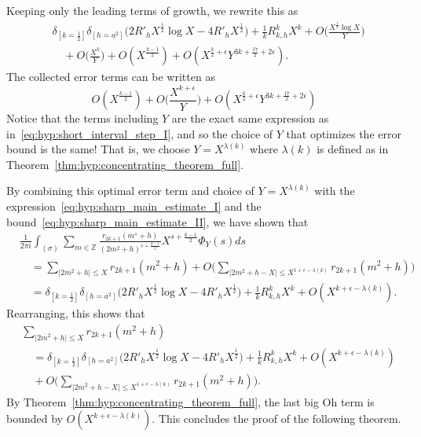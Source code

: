 Keeping only the leading terms of growth, we rewrite this as
\begin{align}
  &\delta_{[k = \frac{1}{2}]} \delta_{[h = a^2]} \bigg( 2 R'_h X^{\frac{1}{2}} \log X -4
R'_h X^{\frac{1}{2}} \bigg) + \tfrac{1}{k} R_{k, h}^k X^{k} +  O\big(\frac{X^{\frac{1}{2}}
\log X}{Y}\big) \\
  &\quad + O\big(\frac{X^{k}}{Y}\big)
  + O(X^{\frac{k-1}{2}})
  + O(X^{\frac{k}{2} + \epsilon} Y^{3k + \frac{17}{2} + 2\epsilon}).
\end{align}
The collected error terms can be written as
\begin{equation}
  O(X^{\frac{k-1}{2}})
  + O\big(\frac{X^{k+\epsilon}}{Y}\big)
  + O(X^{\frac{k}{2} + \epsilon} Y^{3k + \frac{17}{2} + 2\epsilon})
\end{equation}
Notice that the terms including $Y$ are the exact same expression as
in~\eqref{eq:hyp:short_interval_step_I}, and so the choice of $Y$ that optimizes the error
bound is the same!
That is, we choose $Y = X^{\lambda(k)}$ where $\lambda(k)$ is defined as in
Theorem~\ref{thm:hyp:concentrating_theorem_full}.


By combining this optimal error term and choice of $Y = X^{\lambda(k)}$ with the
expression~\eqref{eq:hyp:sharp_main_estimate_I} and the
bound~\eqref{eq:hyp:sharp_main_estimate_II}, we have shown that
\begin{align}
  &\frac{1}{2\pi i} \int_{(\sigma)} \sum_{m \in \mathbb{Z}} \frac{r_{2k+1}{(m^s +
h)}}{(2m^2 + h)^{s + \frac{k-1}{2}}} X^{s + \frac{k-1}{2}} \Phi_Y(s) ds \\
  &\quad =\sum_{\lvert 2m^2 + h \rvert \leq X} r_{2k+1}(m^2 + h) +O \bigg( \sum_{\lvert
  2m^2+h - X \rvert \leq X^{1 + \epsilon - \lambda(k)}} r_{2k+1}(m^2+h)\bigg)  \\
  &\quad = \delta_{[k = \frac{1}{2}]} \delta_{[h = a^2]} \bigg( 2 R'_h X^{\frac{1}{2}}
\log X -4 R'_h X^{\frac{1}{2}} \bigg) + \tfrac{1}{k} R_{k, h}^k X^{k} + O(X^{k + \epsilon
- \lambda(k)}).
\end{align}
Rearranging, this shows that
\begin{align}
  &\sum_{\lvert 2m^2 + h \rvert \leq X} r_{2k+1}(m^2 + h) \\
  &\quad = \delta_{[k = \frac{1}{2}]} \delta_{[h = a^2]} \bigg( 2 R'_h X^{\frac{1}{2}}
\log X -4 R'_h X^{\frac{1}{2}} \bigg) + \tfrac{1}{k} R_{k, h}^k X^{k} + O(X^{k + \epsilon
- \lambda(k)}) \\
  &\quad + O \bigg( \sum_{\lvert 2m^2+h - X \rvert \leq X^{1 + \epsilon - \lambda(k)}}
  r_{2k+1}(m^2+h)\bigg).
\end{align}
By Theorem~\ref{thm:hyp:concentrating_theorem_full}, the last big Oh term is bounded by
$O(X^{k + \epsilon - \lambda(k)})$.
This concludes the proof of the following theorem.


